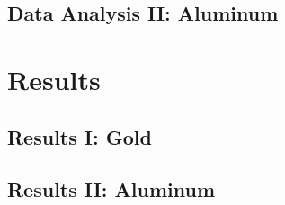 \documentclass[a4paper]{article}
\begin{document}
\qq

\qq 

\qq 

\qq 

\qq 

\subsection{Data Analysis II: Aluminum}

\qq

\qq 

\qq 

\qq 

\qq 

\section{Results}

\subsection{Results I: Gold}

\qq 

\qq 

\qq

\subsection{Results II: Aluminum}

\qq 

\qq 
\end{document}
